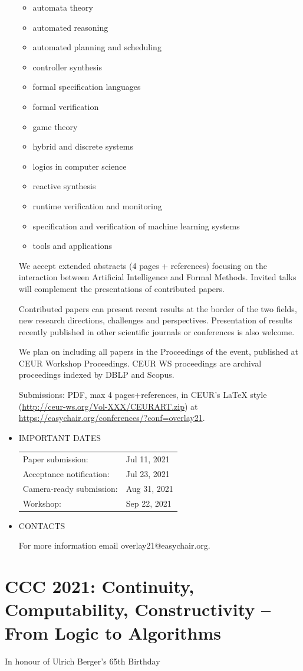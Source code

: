\documentclass[prodmode,acmtecs]{acmsmall} %
\begin{document}
\begin{itemize}
\begin{itemize}\item  automata theory
\item  automated reasoning
\item  automated planning and scheduling
\item  controller synthesis
\item  formal specification languages
\item  formal verification
\item  game theory
\item  hybrid and discrete systems
\item  logics in computer science
\item  reactive synthesis
\item  runtime verification and monitoring
\item  specification and verification of machine learning systems
\item  tools and applications
\end{itemize} 
  We accept extended abstracts (4 pages + references) focusing on the interaction between Artificial Intelligence and Formal Methods. Invited talks will complement the presentations of contributed papers. 
 
  Contributed papers can present recent results at the border of the two fields, new research directions, challenges and perspectives. Presentation of results recently published in other scientific journals or conferences is also welcome. 
 
  We plan on including all papers in the Proceedings of the event, published at CEUR Workshop Proceedings. CEUR WS proceedings are archival proceedings indexed by DBLP and Scopus. 
 
  Submissions: PDF, max 4 pages+references, in CEUR's LaTeX style (\href{http://ceur-ws.org/Vol-XXX/CEURART.zip}{http://ceur-ws.org/Vol-XXX/CEURART.zip}) at \href{https://easychair.org/conferences/?conf=overlay21}{https://easychair.org/conferences/?conf=overlay21}. 
 
\item  IMPORTANT DATES 
 
\begin{tabulary}{\linewidth}{LL}Paper submission:  & Jul 11, 2021 \\
Acceptance notification:  & Jul 23, 2021 \\
Camera-ready submission:  & Aug 31, 2021 \\
Workshop:  & Sep 22, 2021 \\
\end{tabulary}
 
\item  CONTACTS 
 
  For more information email overlay21@easychair.org. 
 
\end{itemize}\section{CCC 2021: Continuity, Computability, Constructivity – From Logic to Algorithms}\label{CCC2021}  In honour of Ulrich Berger’s 65th Birthday \\ 
\end{document}
